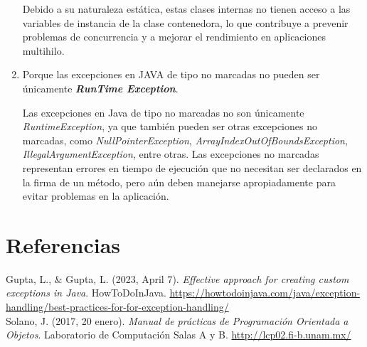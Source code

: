 \documentclass[11pt, twocolumn]{article}
\begin{document}
\begin{enumerate}
    Debido a su naturaleza estática, estas clases internas no tienen acceso a las variables de instancia de la clase contenedora, lo que contribuye a prevenir problemas de concurrencia y a mejorar el rendimiento en aplicaciones multihilo.
    
    \item Porque las excepciones en JAVA de tipo no marcadas no pueden ser únicamente
    \textit{\textbf{RunTime Exception}}.

    Las excepciones en Java de tipo no marcadas no son únicamente \textit{RuntimeException}, ya que también pueden ser otras excepciones no marcadas, como \textit{NullPointerException}, \textit{ArrayIndexOutOfBoundsException}, \textit{IllegalArgumentException}, entre otras. Las excepciones no marcadas representan errores en tiempo de ejecución que no necesitan ser declarados en la firma de un método, pero aún deben manejarse apropiadamente para evitar problemas en la aplicación.
  \end{enumerate}

  \section*{Referencias}
  \begin{small}
    Gupta, L., $\&$ Gupta, L. (2023, April 7). \textit{Effective approach for creating custom exceptions in Java}. HowToDoInJava. \url{https://howtodoinjava.com/java/exception-handling/best-practices-for-for-exception-handling/} \\

    Solano, J. (2017, 20 enero). \textit{Manual de prácticas de Programación Orientada a Objetos}. Laboratorio de Computación Salas A y B. \url{http://lcp02.fi-b.unam.mx/} \\
  \end{small}
\end{document}
